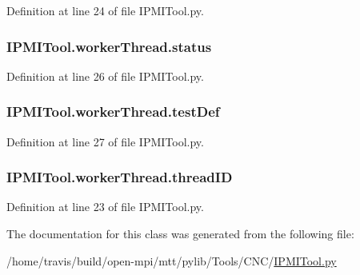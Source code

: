 Definition at line 24 of file I\-P\-M\-I\-Tool.\-py.

\hypertarget{classIPMITool_1_1workerThread_a611bfcde0fa8d328904fde134bde0d87}{
\subsubsection[{status}]{\setlength{\rightskip}{0pt plus 5cm}I\-P\-M\-I\-Tool.\-worker\-Thread.\-status}}\label{classIPMITool_1_1workerThread_a611bfcde0fa8d328904fde134bde0d87}


Definition at line 26 of file I\-P\-M\-I\-Tool.\-py.

\hypertarget{classIPMITool_1_1workerThread_a83638bfbceb196edbfd06990e230cd8e}{
\subsubsection[{test\-Def}]{\setlength{\rightskip}{0pt plus 5cm}I\-P\-M\-I\-Tool.\-worker\-Thread.\-test\-Def}}\label{classIPMITool_1_1workerThread_a83638bfbceb196edbfd06990e230cd8e}


Definition at line 27 of file I\-P\-M\-I\-Tool.\-py.

\hypertarget{classIPMITool_1_1workerThread_ad9622aa9a06ed124fa430c7f57335335}{
\subsubsection[{thread\-I\-D}]{\setlength{\rightskip}{0pt plus 5cm}I\-P\-M\-I\-Tool.\-worker\-Thread.\-thread\-I\-D}}\label{classIPMITool_1_1workerThread_ad9622aa9a06ed124fa430c7f57335335}


Definition at line 23 of file I\-P\-M\-I\-Tool.\-py.



The documentation for this class was generated from the following file\-:\begin{DoxyCompactItemize}
\item 
/home/travis/build/open-\/mpi/mtt/pylib/\-Tools/\-C\-N\-C/\hyperlink{IPMITool_8py}{I\-P\-M\-I\-Tool.\-py}\end{DoxyCompactItemize}
